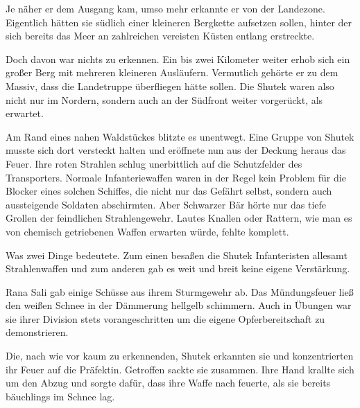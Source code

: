 \par

Je näher er dem Ausgang kam, umso mehr erkannte er von der Landezone. Eigentlich hätten sie südlich einer kleineren Bergkette aufsetzen sollen, hinter der sich bereits das Meer an zahlreichen vereisten Küsten entlang erstreckte.

\par

Doch davon war nichts zu erkennen. Ein bis zwei Kilometer weiter erhob sich ein großer Berg mit mehreren kleineren Ausläufern. Vermutlich gehörte er zu dem Massiv, dass die Landetruppe überfliegen hätte sollen. Die Shutek waren also nicht nur im Nordern, sondern auch an der Südfront weiter vorgerückt, als erwartet.

\par

Am Rand eines nahen Waldstückes blitzte es unentwegt. Eine Gruppe von Shutek musste sich dort versteckt halten und eröffnete nun aus der Deckung heraus das Feuer. Ihre roten Strahlen schlug unerbittlich auf die Schutzfelder des Transporters. Normale Infanteriewaffen waren in der Regel kein Problem für die Blocker eines solchen Schiffes, die nicht nur das Gefährt selbst, sondern auch aussteigende Soldaten abschirmten. Aber Schwarzer Bär hörte nur das tiefe Grollen der feindlichen Strahlengewehr. Lautes Knallen oder Rattern, wie man es von chemisch getriebenen Waffen erwarten würde, fehlte komplett.

\par

Was zwei Dinge bedeutete. Zum einen besaßen die Shutek Infanteristen allesamt Strahlenwaffen und zum anderen gab es weit und breit keine eigene Verstärkung.

\par

Rana Sali gab einige Schüsse aus ihrem Sturmgewehr ab. Das Mündungsfeuer ließ den weißen Schnee in der Dämmerung hellgelb schimmern. Auch in Übungen war sie ihrer Division stets vorangeschritten um die eigene Opferbereitschaft zu demonstrieren.

\par

Die, nach wie vor kaum zu erkennenden, Shutek erkannten sie und konzentrierten ihr Feuer auf die Präfektin. Getroffen sackte sie zusammen. Ihre Hand krallte sich um den Abzug und sorgte dafür, dass ihre Waffe nach feuerte, als sie bereits bäuchlings im Schnee lag.

\par

